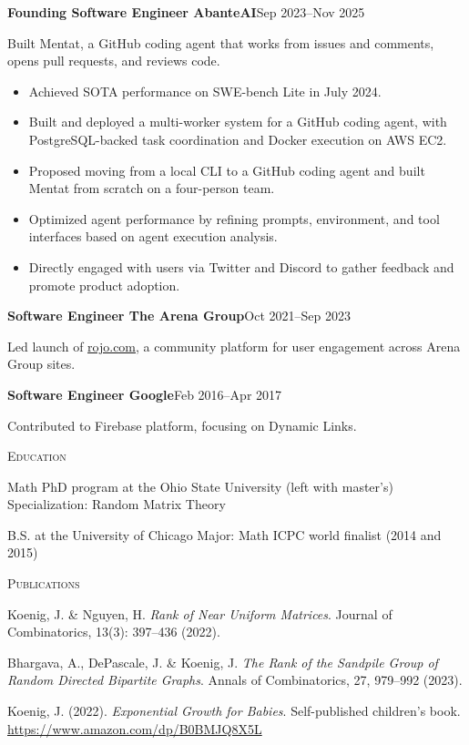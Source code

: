 \documentclass[a4paper,10pt]{article}
\newlength{\ResumeEducationInset}
\newcommand{\ResumeDate}[1]{{\small\color{detail}#1}}
\newcommand{\ResumeSection}[1]{%
  \par\addvspace{9pt}%
  {\large\scshape\color{accent}#1\par}\nobreak
  \vspace{2pt}{\color{accent}\hrule height 0.4pt}
  \vspace{4pt}\nobreak
}
\newenvironment{experience}[3]{%
  \par\addvspace{6pt}%
  \noindent\begin{minipage}[t]{\linewidth}
    \raggedright
    \noindent\textbf{#2 \textbar{} #3}\hfill\ResumeDate{#1}\par
    \ignorespaces
}{\end{minipage}\par}
\newcommand{\ResumeEducation}[2]{%
  \par\noindent
  \makebox[\ResumeEducationInset][l]{\ResumeDate{#1}}%
  \begin{minipage}[t]{\dimexpr\linewidth-\ResumeEducationInset\relax}
    \raggedright #2
  \end{minipage}\par
}
\newcommand{\ResumePublication}[1]{%
  \par\addvspace{3pt}#1\par
}
\begin{document}
\vspace{5pt}
\begin{experience}{Sep 2023--Nov 2025}{Founding Software Engineer}{AbanteAI}
Built Mentat, a GitHub coding agent that works from issues and comments, opens pull requests, and reviews code.
\begin{itemize}
  \item Achieved SOTA performance on SWE-bench Lite in July 2024.
  \item Built and deployed a multi-worker system for a GitHub coding agent, with PostgreSQL-backed task coordination and Docker execution on AWS EC2.
  \item Proposed moving from a local CLI to a GitHub coding agent and built Mentat from scratch on a four-person team.
  \item Optimized agent performance by refining prompts, environment, and tool interfaces based on agent execution analysis.
  \item Directly engaged with users via Twitter and Discord to gather feedback and promote product adoption.
\end{itemize}
\end{experience}

\vspace{5pt}
\begin{experience}{Oct 2021--Sep 2023}{Software Engineer}{The Arena Group}
Led launch of \href{https://rojo.com}{rojo.com}, a community platform for user engagement across Arena Group sites.
\end{experience}

\vspace{5pt}
\begin{experience}{Feb 2016--Apr 2017}{Software Engineer}{Google}
Contributed to Firebase platform, focusing on Dynamic Links.
\end{experience}

\ResumeSection{Education}
\ResumeEducation{2017--2021}{%
  Math PhD program at the Ohio State University (left with master's)\newline
  Specialization: Random Matrix Theory
}
\vspace{5pt}
\ResumeEducation{2012--2015}{%
  B.S. at the University of Chicago\newline
  Major: Math\newline
  ICPC world finalist (2014 and 2015)
}

\ResumeSection{Publications}
\ResumePublication{Koenig, J. \& Nguyen, H. \emph{Rank of Near Uniform Matrices}. Journal of Combinatorics, 13(3): 397--436 (2022).}
\ResumePublication{Bhargava, A., DePascale, J. \& Koenig, J. \emph{The Rank of the Sandpile Group of Random Directed Bipartite Graphs}. Annals of Combinatorics, 27, 979--992 (2023).}
\ResumePublication{Koenig, J. (2022). \emph{Exponential Growth for Babies}. Self-published children's book. \url{https://www.amazon.com/dp/B0BMJQ8X5L}}
\end{document}
